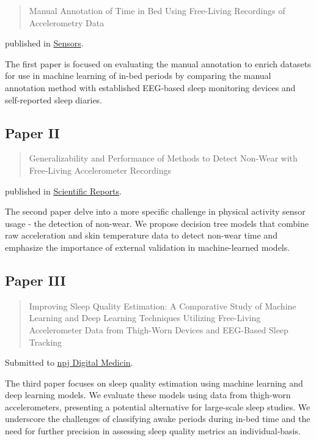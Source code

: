 \documentclass[
  10pt,
  letterpaper,
  DIV=11,
  numbers=noendperiod]{scrartcl}
\begin{document}
\begin{quote}
Manual Annotation of Time in Bed Using Free-Living Recordings of
Accelerometry Data\autocite{skovgaard_manual_2021}
\end{quote}

published in \href{https://doi.org/10.3390/s21248442}{Sensors}.

The first paper is focused on evaluating the manual annotation to enrich
datasets for use in machine learning of in-bed periods by comparing the
manual annotation method with established EEG-based sleep monitoring
devices and self-reported sleep diaries.

\hypertarget{paper-ii}{%
\subsection{Paper II}\label{paper-ii}}

\begin{quote}
Generalizability and Performance of Methods to Detect Non‑Wear with
Free‑Living Accelerometer
Recordings\autocite{skovgaard_generalizability_2023}
\end{quote}

published in
\href{https://doi.org/10.1038/s41598-023-29666-x}{Scientific Reports}.

The second paper delve into a more specific challenge in physical
activity sensor usage - the detection of non-wear. We propose decision
tree models that combine raw acceleration and skin temperature data to
detect non-wear time and emphasize the importance of external validation
in machine-learned models.

\hypertarget{paper-iii}{%
\subsection{Paper III}\label{paper-iii}}

\begin{quote}
Improving Sleep Quality Estimation: A Comparative Study of Machine
Learning and Deep Learning Techniques Utilizing Free-Living
Accelerometer Data from Thigh-Worn Devices and EEG-Based Sleep Tracking
\end{quote}

Submitted to \href{https://www.nature.com/npjdigitalmed/}{npj Digital
Medicin}.

The third paper focuses on sleep quality estimation using machine
learning and deep learning models. We evaluate these models using data
from thigh-worn accelerometers, presenting a potential alternative for
large-scale sleep studies. We underscore the challenges of classifying
awake periods during in-bed time and the need for further precision in
assessing sleep quality metrics an individual-basis.
\end{document}
